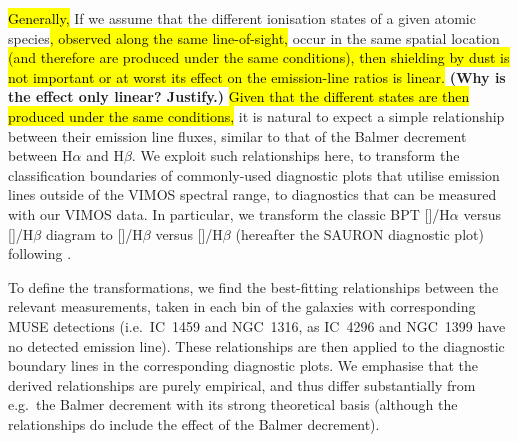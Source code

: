 \documentclass[a4paper,fleqn,usenatbib]{mnras}
\DeclareRobustCommand{\removed}[1]{{\sethlcolor{red}\hl{#1}}}
\DeclareRobustCommand{\added}[1]{{\sethlcolor{green}\hl{#1}}}
\begin{document}
\removed{Generally, } If we assume that the different ionisation states of a
given atomic species\added{, observed along the same line-of-sight,} occur in 
the same spatial location \added{(and therefore are produced under the same 
conditions)}\removed{, then shielding by dust is not important or at worst its 
effect on the emission-line ratios is linear.} \textbf{(Why is the effect only 
linear? Justify.)} \removed{Given that the different states are then produced under
the same conditions,} it is natural to expect a simple relationship
between their emission line fluxes, similar to that of the Balmer
decrement between H$\alpha$ and H$\beta$. We exploit such
relationships here, to transform the classification boundaries of
commonly-used diagnostic plots that utilise emission lines outside of
the VIMOS spectral range, to diagnostics that can be measured with our
VIMOS data. In particular, we transform the classic BPT
[]/H$\alpha$ versus []/H$\beta$ diagram to
[]/H$\beta$ versus []/H$\beta$ (hereafter the
SAURON diagnostic plot) following \citet{Sarzi2010}.

To define the transformations, we find the best-fitting relationships
between the relevant measurements, taken in each bin of the galaxies
with corresponding MUSE detections (i.e.\ IC~1459 and NGC~1316, as
IC~4296 and NGC~1399 have no detected emission line). These
relationships are then applied to the diagnostic boundary lines in the
corresponding diagnostic plots. We emphasise that the derived
relationships are purely empirical, and thus differ substantially from
e.g.\ the Balmer decrement with its strong theoretical basis (although
the relationships do include the effect of the Balmer decrement).
\end{document}
